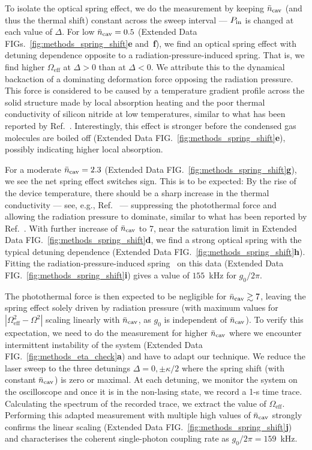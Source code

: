 \documentclass[./Main-revtex.tex]{subfiles}
\begin{document}
To isolate the optical spring effect, we do the measurement by keeping $\bar{n}_\text{cav}$ (and thus the thermal shift) constant across the sweep interval --- $P_\text{in}$ is changed at each value of $\Delta$. For low $\bar{n}_\text{cav} = 0.5$ (Extended Data FIGs.~\ref{fig:methods_spring_shift}\textbf{e} and~\textbf{f}), we find an optical spring effect with detuning dependence opposite to a radiation-pressure-induced spring. That is, we find higher $\Omega_\text{eff}$ at $\Delta > 0$ than at $\Delta < 0$. We attribute this to the dynamical backaction of a dominating deformation force opposing the radiation pressure. This force is considered to be caused by a temperature gradient profile across the solid structure made by local absorption heating and the poor thermal conductivity of silicon nitride at low temperatures, similar to what has been reported by Ref.~\cite{hauer2019dueling}. Interestingly, this effect is stronger before the condensed gas molecules are boiled off (Extended Data FIG.~\ref{fig:methods_spring_shift}\textbf{e}), possibly indicating higher local absorption.

For a moderate $\bar{n}_\text{cav} = 2.3$ (Extended Data FIG.~\ref{fig:methods_spring_shift}\textbf{g}), we see the net spring effect switches sign. This is to be expected: By the rise of the device temperature, there should be a sharp increase in the thermal conductivity --- see, e.g., Ref.~\cite{ftouni2015thermal} --- suppressing the photothermal force and allowing the radiation pressure to dominate, similar to what has been reported by Ref.~\cite{hauer2019dueling}. With further increase of $\bar{n}_\text{cav}$ to 7, near the saturation limit in Extended Data FIG.~\ref{fig:methods_spring_shift}\textbf{d}, we find a strong optical spring with the typical detuning dependence (Extended Data FIG.~\ref{fig:methods_spring_shift}\textbf{h}). Fitting the radiation-pressure-induced spring~\cite{bowen2015quantum} on this data (Extended Data FIG.~\ref{fig:methods_spring_shift}\textbf{i}) gives a value of $155$~kHz for $g_0/2\pi$.

The photothermal force is then expected to be negligible for $\bar{n}_\text{cav}\gtrsim7$, leaving the spring effect solely driven by radiation pressure (with maximum values for $|\Omega_\text{eff}^2-\Omega^2|$ scaling linearly with $\bar{n}_\text{cav}$, as $g_0$ is independent of $\bar{n}_\text{cav}$). To verify this expectation, we need to do the measurement for higher $\bar{n}_\text{cav}$ where we encounter intermittent instability of the system (Extended Data FIG.~\ref{fig:methods_eta_check}\textbf{a}) and have to adapt our technique. We reduce the laser sweep to the three detunings $\Delta = 0, \pm\kappa/2$ where the spring shift (with constant $\bar{n}_\text{cav}$) is zero or maximal. At each detuning, we monitor the system on the oscilloscope and once it is in the non-lasing state, we record a 1-s time trace. Calculating the spectrum of the recorded trace, we extract the value of $\Omega_\text{eff}$. Performing this adapted measurement with multiple high values of $\bar{n}_\text{cav}$ strongly confirms the linear scaling (Extended Data FIG.~\ref{fig:methods_spring_shift}\textbf{j}) and characterises the coherent single-photon coupling rate as $g_0/2\pi=159$~kHz.
\end{document}
